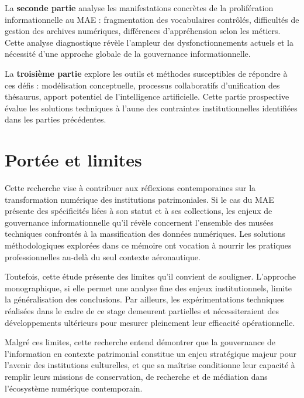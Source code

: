 La \textbf{seconde partie} analyse les manifestations concrètes de la prolifération informationnelle au MAE : fragmentation des vocabulaires contrôlés, difficultés de gestion des archives numériques, différences d'appréhension selon les métiers. Cette analyse diagnostique révèle l'ampleur des dysfonctionnements actuels et la nécessité d'une approche globale de la gouvernance informationnelle.

La \textbf{troisième partie} explore les outils et méthodes susceptibles de répondre à ces défis : modélisation conceptuelle, processus collaboratifs d'unification des thésaurus, apport potentiel de l'intelligence artificielle. Cette partie prospective évalue les solutions techniques à l'aune des contraintes institutionnelles identifiées dans les parties précédentes.

\section*{Portée et limites}

Cette recherche vise à contribuer aux réflexions contemporaines sur la transformation numérique des institutions patrimoniales. Si le cas du MAE présente des spécificités liées à son statut et à ses collections, les enjeux de gouvernance informationnelle qu'il révèle concernent l'ensemble des musées techniques confrontés à la massification des données numériques. Les solutions méthodologiques explorées dans ce mémoire ont vocation à nourrir les pratiques professionnelles au-delà du seul contexte aéronautique.

Toutefois, cette étude présente des limites qu'il convient de souligner. L'approche monographique, si elle permet une analyse fine des enjeux institutionnels, limite la généralisation des conclusions. Par ailleurs, les expérimentations techniques réalisées dans le cadre de ce stage demeurent partielles et nécessiteraient des développements ultérieurs pour mesurer pleinement leur efficacité opérationnelle.

Malgré ces limites, cette recherche entend démontrer que la gouvernance de l'information en contexte patrimonial constitue un enjeu stratégique majeur pour l'avenir des institutions culturelles, et que sa maîtrise conditionne leur capacité à remplir leurs missions de conservation, de recherche et de médiation dans l'écosystème numérique contemporain.